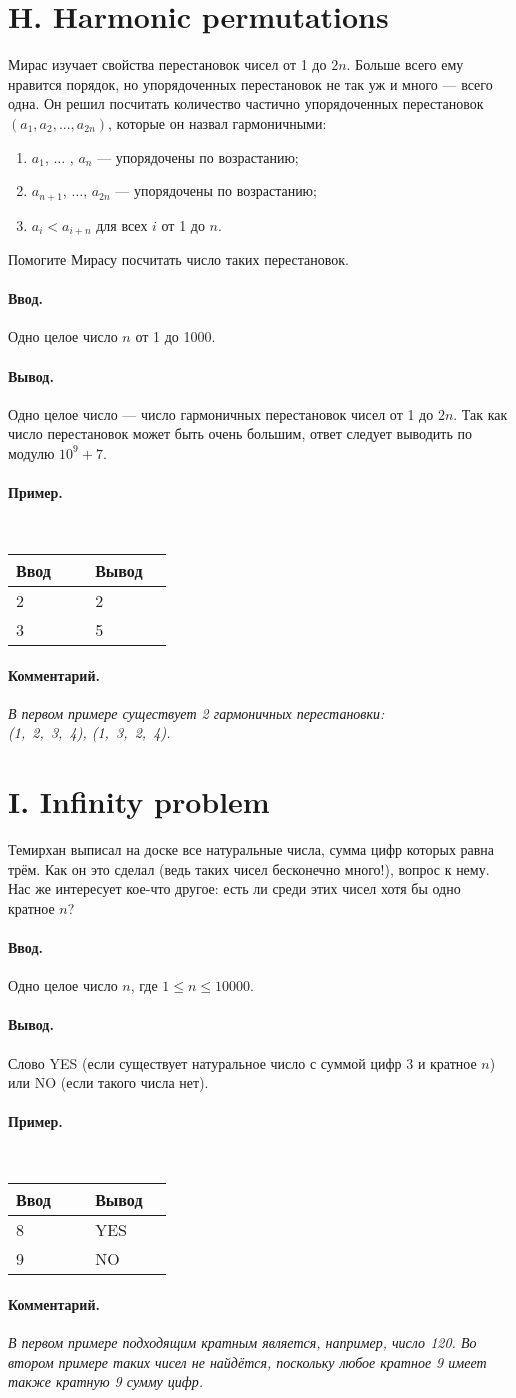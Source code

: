 \documentclass[12pt, a5paper]{article}
\newcommand{\informat}[1]
{
	\paragraph{Ввод.\\} #1
}
\newcommand{\outformat}[1]
{
	\paragraph{Вывод.\\} #1
}
\newcommand{\examplee}[4]
{
	\paragraph{Пример.\\}
	{\tt
	\begin{tabular}{|p{0.4\linewidth}|p{0.4\linewidth}|}
	\hline
	Ввод 	& Вывод  	\\
	\hline
	#1 		& #2 		\\
	\hline
	#3		& #4		\\
	\hline
	\end{tabular}
	}
}
\newcommand{\excomm}[1]
{
	\paragraph{Комментарий. \\}
	\textit{#1}
}
\begin{document}
\section*{H. Harmonic permutations}

Мирас изучает свойства перестановок чисел от 1 до $2n$. Больше всего ему нравится порядок, но упорядоченных перестановок не так уж и много --- всего одна. Он решил посчитать количество частично упорядоченных перестановок $(a_1, a_2, ..., a_{2n})$, которые он назвал гармоничными:

\begin{enumerate}
\item $a_1$, $\dots$ , $a_n$ --- упорядочены по возрастанию;
\item $a_{n+1}$, $\dots$, $a_{2n}$ --- упорядочены по возрастанию;
\item $a_i < a_{i+n}$ для всех $i$ от 1 до $n$.
\end{enumerate}

Помогите Мирасу посчитать число таких перестановок.

\informat{Одно целое число $n$ от 1 до 1000.}

\outformat{Одно целое число --- число гармоничных перестановок чисел от 1 до $2n$. Так как число перестановок может быть очень большим, ответ следует выводить по модулю $10^9 + 7$.}

\examplee{2}{2}{3}{5}

\excomm{В первом примере существует 2 гармоничных перестановки:\\ \mbox{(1, 2, 3, 4)}, \mbox{(1, 3, 2, 4)}.}



\section*{I. Infinity problem}

Темирхан выписал на доске все натуральные числа, сумма цифр которых равна трём. Как он это сделал (ведь таких чисел бесконечно много!), вопрос к нему. Нас же интересует кое-что другое: есть ли среди этих чисел хотя бы одно кратное $n$?

\informat{Одно целое число $n$, где $1 \le n \le 10 000$.}

\outformat{Слово YES (если существует натуральное число с суммой цифр 3 и кратное $n$) или NO (если такого числа нет).}

\examplee{8}{YES}{9}{NO}

\excomm{В первом примере подходящим кратным является, например, число 120. Во втором примере таких чисел не найдётся, поскольку любое кратное 9 имеет также кратную 9 сумму цифр.}
\end{document}
